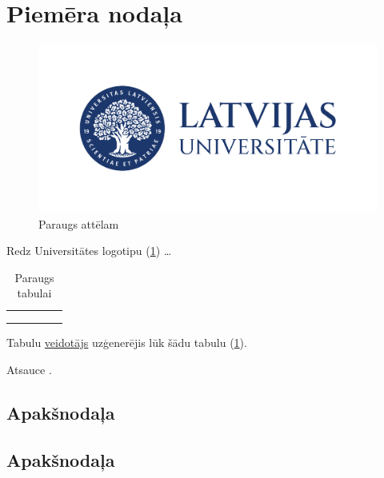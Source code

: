 \section{Piemēra nodaļa}

\blindtext

\begin{figure}[h]
    \centering
    \includegraphics[scale=0.1]{images/LU_logotips_LAT_horiz.jpg}
    \caption{Paraugs attēlam}
    \label{fig:lu}
\end{figure}

Redz Universitātes logotipu (\ref{fig:lu}) \dots

\begin{table}[h]
    \centering
    \begin{tabular}{|l|l|l|l|l|}
        \hline
         &  &  &  & \\ \hline
         &  &  &  & \\ \hline
         &  &  &  & \\ \hline
         &  &  &  & \\ \hline
    \end{tabular}
    \caption{Paraugs tabulai}
    \label{tbl:ex}
\end{table}

Tabulu \href{https://www.tablesgenerator.com/}{veidotājs} uzģenerējis lūk šādu tabulu (\ref{tbl:ex}).

Atsauce \cite{knuthwebsite,knuth-fa}.

\subsection{Apakšnodaļa}

\blindtext

\subsection{Apakšnodaļa}

\blindtext

\Blinddocument
